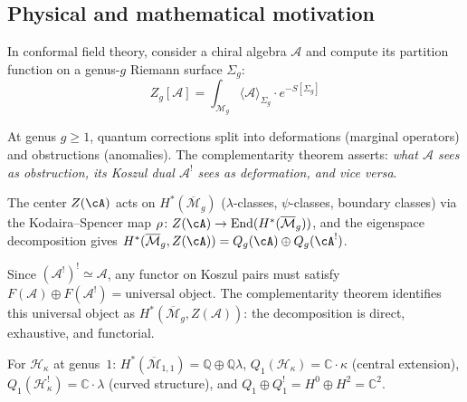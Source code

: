 \subsection{Physical and mathematical motivation}

\begin{remark}
In conformal field theory, consider a chiral algebra $\mathcal{A}$ and compute its
partition function on a genus-$g$ Riemann surface $\Sigma_g$:
\begin{equation}
Z_g[\mathcal{A}] = \int_{\mathcal{M}_g} \langle \mathcal{A} \rangle_{\Sigma_g} 
\cdot e^{-S[\Sigma_g]}
\end{equation}

At genus $g \geq 1$, quantum corrections split into deformations (marginal operators) and obstructions (anomalies).
The complementarity theorem asserts: \emph{what $\mathcal{A}$ sees as obstruction,
its Koszul dual $\mathcal{A}^!$ sees as deformation, and vice versa}.

\end{remark}

\begin{remark}
The center $Z(\cA)$ acts on $H^*(\overline{\mathcal{M}}_g)$
($\lambda$-classes, $\psi$-classes, boundary classes) via the
Kodaira--Spencer map
$\rho\colon Z(\cA)\to\mathrm{End}(H^*(\overline{\mathcal{M}}_g))$,
and the eigenspace decomposition gives
$H^*(\overline{\mathcal{M}}_g,Z(\cA))
=Q_g(\cA)\oplus Q_g(\cA^!)$.
\end{remark}

\begin{remark}
Since $(\mathcal{A}^!)^! \simeq \mathcal{A}$, any functor on Koszul pairs must satisfy $F(\mathcal{A}) \oplus F(\mathcal{A}^!) = \text{universal object}$.  The complementarity theorem identifies this universal object as $H^*(\overline{\mathcal{M}}_g, Z(\mathcal{A}))$: the decomposition is direct, exhaustive, and functorial.
\end{remark}

\begin{remark}
For $\mathcal{H}_\kappa$ at genus~$1$:
$H^*(\overline{\mathcal{M}}_{1,1})=\mathbb{Q}\oplus\mathbb{Q}\lambda$,
$Q_1(\mathcal{H}_\kappa)=\mathbb{C}\cdot\kappa$ (central extension),
$Q_1(\mathcal{H}_\kappa^!)=\mathbb{C}\cdot\lambda$ (curved structure),
and $Q_1\oplus Q_1^!=H^0\oplus H^2=\mathbb{C}^2$.
\end{remark}

